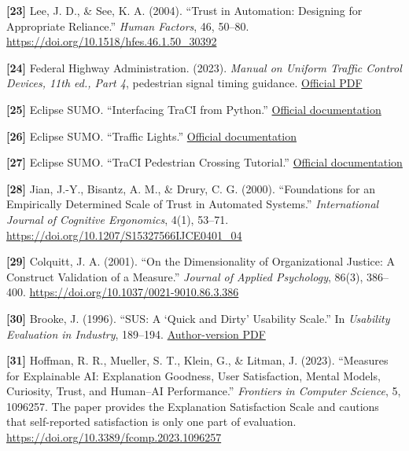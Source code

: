 \documentclass[
  english,
  11pt,
  a4paper,
]{article}
\begin{document}
\protect{}\label{source-23}{} \textbf{{[}23{]}} Lee, J. D.,
\& See, K. A. (2004). ``Trust in Automation: Designing for Appropriate
Reliance.'' \emph{Human Factors}, 46, 50--80.
\url{https://doi.org/10.1518/hfes.46.1.50_30392}

\protect{}\label{source-24}{} \textbf{{[}24{]}} Federal
Highway Administration. (2023). \emph{Manual on Uniform Traffic Control
Devices, 11th ed., Part 4}, pedestrian signal timing guidance.
\href{https://mutcd.fhwa.dot.gov/pdfs/11th_Edition/part4.pdf}{Official
PDF}

\protect{}\label{source-25}{} \textbf{{[}25{]}} Eclipse
SUMO. ``Interfacing TraCI from Python.''
\href{https://sumo.dlr.de/docs/TraCI/Interfacing_TraCI_from_Python.html}{Official
documentation}

\protect{}\label{source-26}{} \textbf{{[}26{]}} Eclipse
SUMO. ``Traffic Lights.''
\href{https://sumo.dlr.de/docs/Simulation/Traffic_Lights.html}{Official
documentation}

\protect{}\label{source-27}{} \textbf{{[}27{]}} Eclipse
SUMO. ``TraCI Pedestrian Crossing Tutorial.''
\href{https://sumo.dlr.de/docs/Tutorials/TraCIPedCrossing.html}{Official
documentation}

\protect{}\label{source-28}{} \textbf{{[}28{]}} Jian,
J.-Y., Bisantz, A. M., \& Drury, C. G. (2000). ``Foundations for an
Empirically Determined Scale of Trust in Automated Systems.''
\emph{International Journal of Cognitive Ergonomics}, 4(1), 53--71.
\url{https://doi.org/10.1207/S15327566IJCE0401_04}

\protect{}\label{source-29}{} \textbf{{[}29{]}} Colquitt,
J. A. (2001). ``On the Dimensionality of Organizational Justice: A
Construct Validation of a Measure.'' \emph{Journal of Applied
Psychology}, 86(3), 386--400.
\url{https://doi.org/10.1037/0021-9010.86.3.386}

\protect{}\label{source-30}{} \textbf{{[}30{]}} Brooke, J.
(1996). ``SUS: A `Quick and Dirty' Usability Scale.'' In \emph{Usability
Evaluation in Industry}, 189--194.
\href{https://hci-studies.org/methods-and-measures/downloads/SUS_Brooke1996.pdf}{Author-version
PDF}

\protect{}\label{source-31}{} \textbf{{[}31{]}} Hoffman, R.
R., Mueller, S. T., Klein, G., \& Litman, J. (2023). ``Measures for
Explainable AI: Explanation Goodness, User Satisfaction, Mental Models,
Curiosity, Trust, and Human--AI Performance.'' \emph{Frontiers in
Computer Science}, 5, 1096257. The paper provides the Explanation
Satisfaction Scale and cautions that self-reported satisfaction is only
one part of evaluation. \url{https://doi.org/10.3389/fcomp.2023.1096257}
\end{document}
